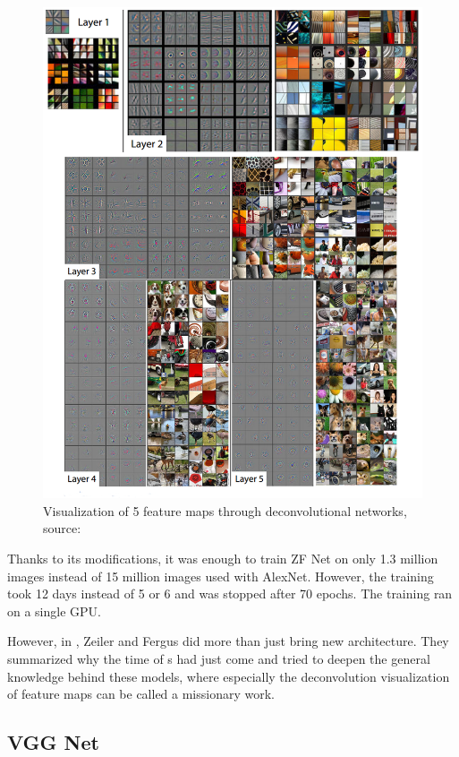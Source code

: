 \begin{figure}[H]
   \centering
	\includegraphics[width=\linewidth]{./pictures/deconvnet.png}
	\caption[Deconvolutional network]{Visualization of 5 feature maps through deconvolutional networks, source: \cite{zf-net}}
      \label{fig:deconvnet}
\end{figure}

Thanks to its modifications, it was enough to train ZF Net on only 1.3 million images instead of 15 million images used with AlexNet. However, the training took 12 days instead of 5 or 6 and was stopped after 70 epochs. The training ran on a single GPU.

However, in \cite{zf-net}, Zeiler and Fergus did more than just bring new architecture. They summarized why the time of s had just come and tried to deepen the general knowledge behind these models, where especially the deconvolution visualization of feature maps can be called a missionary work.

\subsection{VGG Net}
\label{vgg}

